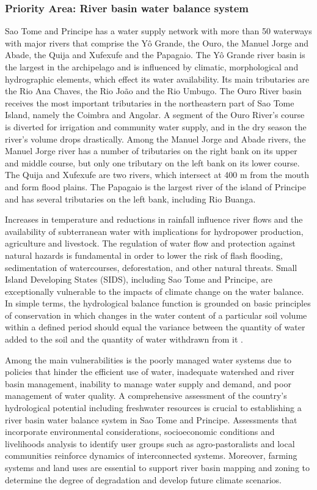 \documentclass[
]{book}
\begin{document}
\hypertarget{priority-area-river-basin-water-balance-system-1}{%
\subsubsection{Priority Area: River basin water balance system}\label{priority-area-river-basin-water-balance-system-1}}

Sao Tome and Principe has a water supply network with more than 50 waterways with major rivers that comprise the Yô Grande, the Ouro, the Manuel Jorge and Abade, the Quija and Xufexufe and the Papagaio. The Yô Grande river basin is the largest in the archipelago and is influenced by climatic, morphological and hydrographic elements, which effect its water availability. Its main tributaries are the Rio Ana Chaves, the Rio João and the Rio Umbugo. The Ouro River basin receives the most important tributaries in the northeastern part of Sao Tome Island, namely the Coimbra and Angolar. A segment of the Ouro River's course is diverted for irrigation and community water supply, and in the dry season the river's volume drops drastically. Among the Manuel Jorge and Abade rivers, the Manuel Jorge river has a number of tributaries on the right bank on its upper and middle course, but only one tributary on the left bank on its lower course. The Quija and Xufexufe are two rivers, which intersect at 400 m from the mouth and form flood plains. The Papagaio is the largest river of the island of Principe and has several tributaries on the left bank, including Rio Buanga.

Increases in temperature and reductions in rainfall influence river flows and the availability of subterranean water with implications for hydropower production, agriculture and livestock. The regulation of water flow and protection against natural hazards is fundamental in order to lower the risk of flash flooding, sedimentation of watercourses, deforestation, and other natural threats. Small Island Developing States (SIDS), including Sao Tome and Principe, are exceptionally vulnerable to the impacts of climate change on the water balance. In simple terms, the hydrological balance function is grounded on basic principles of conservation in which changes in the water content of a particular soil volume within a defined period should equal the variance between the quantity of water added to the soil and the quantity of water withdrawn from it .

Among the main vulnerabilities is the poorly managed water systems due to policies that hinder the efficient use of water, inadequate watershed and river basin management, inability to manage water supply and demand, and poor management of water quality. A comprehensive assessment of the country's hydrological potential including freshwater resources is crucial to establishing a river basin water balance system in Sao Tome and Principe. Assessments that incorporate environmental considerations, socioeconomic conditions and livelihoods analysis to identify user groups such as agro-pastoralists and local communities reinforce dynamics of interconnected systems. Moreover, farming systems and land uses are essential to support river basin mapping and zoning to determine the degree of degradation and develop future climate scenarios.
\end{document}
